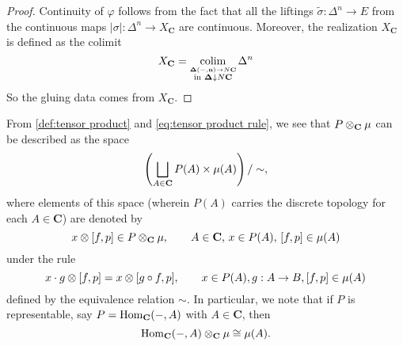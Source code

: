 \begin{proof}

Continuity of $\varphi$ follows from the fact that all the liftings $\widetilde{\sigma} : \Delta^n \to E$ from the continuous maps $|\sigma| : \Delta^n \to X_{\mathbf{C}}$ are continuous. Moreover, the realization $X_{\mathbf{C}}$ is defined as the colimit
\[ X_{\mathbf{C}} = \operatorname*{colim}_{\stackrel{\mathbf{\Delta}(-,\mathbf{n}) \to N\mathbf{C}}{\text{in } \mathbf{\Delta} \downarrow N\mathbf{C}}}\Delta^n \]
So the gluing data comes from $X_{\mathbf{C}}$.

\end{proof}

From \cref{def:tensor product} and \cref{eq:tensor product rule}, we see that $P \otimes_{\mathbf{C}} \operatorname{\mu}$ can be described as the space
\[ \left( \bigsqcup_{A \in \mathbf{C}} P(A) \times \operatorname{\mu}(A) \right) / \sim, \]
where elements of this space (wherein $P(A)$ carries the discrete topology for each $A \in \mathbf{C}$) are denoted by
\[ x \otimes [f,p] \in P \otimes_{\mathbf{C}} \operatorname{\mu}, \qquad A \in \mathbf{C},\, x \in P(A), \, [f,p] \in \operatorname{\mu}(A) \]
under the rule
\[ x \cdot g \otimes [f,p] = x \otimes [g \circ f, p], \qquad x \in P(A), g : A \to B, [f,p] \in \operatorname{\mu}(A) \]
defined by the equivalence relation $\sim$. In particular, we note that if $P$ is representable, say $P = \operatorname{Hom}_{\mathbf{C}}(-,A)$ with $A \in \mathbf{C}$, then
\[ \operatorname{Hom}_{\mathbf{C}}(-,A) \otimes_{\mathbf{C}} \operatorname{\mu} \cong \operatorname{\mu}(A). \]

